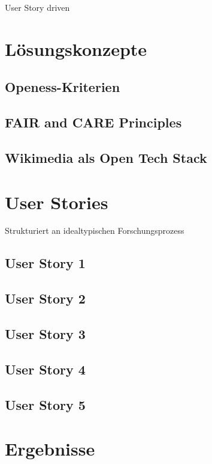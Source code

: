 \onehalfspacing

User Story driven

\section{Lösungskonzepte}
\subsection{Openess-Kriterien}
\subsection{FAIR and CARE Principles}
\subsection{Wikimedia als Open Tech Stack}

\section{User Stories}

Strukturiert an idealtypischen Forschungsprozess

\subsection{User Story 1}

\subsection{User Story 2}

\subsection{User Story 3}

\subsection{User Story 4}

\subsection{User Story 5}

\section{Ergebnisse}